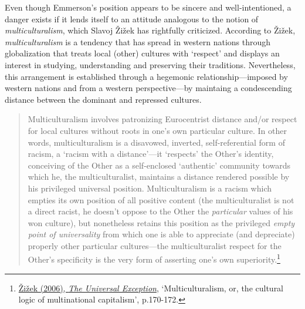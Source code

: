 Even though Emmerson's position appears to be sincere and well-intentioned, a danger exists if it lends itself to an attitude analogous to the notion of \emph{multiculturalism}, which Slavoj \v{Z}i\v{z}ek has rightfully criticized. According to \v{Z}i\v{z}ek, \emph{multiculturalism} is a tendency that has spread in western nations through globalization that treats local (other) cultures with `respect' and displays an interest in studying, understanding and preserving their traditions. Nevertheless, this arrangement is established through a hegemonic relationship---imposed by western nations and from a western perspective---by maintaing a condescending distance between the dominant and repressed cultures.
\begin{quote}
Multiculturalism involves patronizing Eurocentrist distance and/or respect for local cultures without roots in one's own particular culture. In other words, multiculturalism is a disavowed, inverted, self-referential form of racism, a `racism with a distance'---it `respects' the Other's identity, conceiving of the Other as a self-enclosed `authentic' community towards which he, the multiculturalist, maintains a distance rendered possible by his privileged universal position. Multiculturalism is a racism which empties its own position of all positive content (the multiculturalist is not a direct racist, he doesn't oppose to the Other the \emph{particular} values of his won culture), but nonetheless retains this position as the privileged \emph{empty point of universality} from which one is able to appreciate (and depreciate) properly other particular cultures---the multiculturalist respect for the Other's specificity is the very form of asserting one's own superiority.\footnote{\hyperlink{zizekuniv}{\v{Z}i\v{z}ek (2006), \emph{The Universal Exception}}, `Multiculturalism, or, the cultural logic of multinational capitalism', p.170-172.}
\end{quote}
